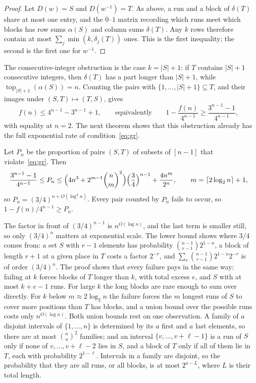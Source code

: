 \documentclass[12pt]{article}
\numberwithin{theorem}{section}
\numberwithin{equation}{section}
\begin{document}
\begin{proof}
Let $D(w)=S$ and $D(w^{-1})=T$. As above, a run and a block of $\delta(T)$ share at most one entry, and the
$0$--$1$ matrix recording which runs meet which blocks has row sums $\alpha(S)$ and column sums $\delta(T)$. Any
$k$ rows therefore contain at most $\sum_j\min(k,\delta_j(T))$ ones. This is the first inequality; the second is
the first one for $w^{-1}$.
\end{proof}

The consecutive-integer obstruction is the case $k=|S|+1$: if $T$ contains $|S|+1$ consecutive integers, then
$\delta(T)$ has a part longer than $|S|+1$, while $\operatorname{top}_{|S|+1}(\alpha(S))=n$. Counting the pairs
with $\{1,\dots,|S|+1\}\subseteq T$, and their images under $(S,T)\mapsto(T,S)$, gives
\[
f(n)\le 4^{n-1}-3^{n-1}+1,\qquad\text{equivalently}\qquad 1-\frac{f(n)}{4^{n-1}}\ge\frac{3^{n-1}-1}{4^{n-1}},
\]
with equality at $n=2$. The next theorem shows that this obstruction already has the full exponential rate of
condition~\eqref{eq:gr}.

\begin{theorem}\label{thm:grrate}
Let $P_n$ be the proportion of pairs $(S,T)$ of subsets of $[n-1]$ that violate~\eqref{eq:gr}. Then
\[
\frac{3^{n-1}-1}{4^{n-1}}\le P_n\le
\Bigl(4n^3+2^{m-1}\binom nm^2\Bigr)\Bigl(\frac34\Bigr)^{n-1}+\frac{4n^m}{2^{n}},
\qquad m=\lceil2\log_2n\rceil+1,
\]
so $P_n=(3/4)^{n+O(\log^2 n)}$. Every pair counted by $P_n$ fails to occur, so $1-f(n)/4^{n-1}\ge P_n$.
\end{theorem}

The factor in front of $(3/4)^{n-1}$ is $n^{O(\log n)}$, and the last term is smaller still, so only $(3/4)^n$
matters at exponential scale. The lower bound shows where $3/4$ comes from: a set $S$ with $r-1$ elements has
probability $\binom{n-1}{r-1}2^{1-n}$, a block of length $r+1$ at a given place in $T$ costs a factor $2^{-r}$,
and $\sum_r\binom{n-1}{r-1}2^{1-n}2^{-r}$ is of order $(3/4)^{n}$. The proof shows that every failure pays in the
same way: failing at $k$ forces blocks of $T$ longer than $k$, with total excess $e$, and $S$ with at most $k+e-1$
runs. For large $k$ the long blocks are rare enough to sum over directly. For $k$ below $m\approx2\log_2n$ the
failure forces the $m$ longest runs of $S$ to cover more positions than $T$ has blocks, and a union bound over the
possible runs costs only $n^{O(\log n)}$. Both union bounds rest on one observation. A family of $a$ disjoint
intervals of $\{1,\dots,n\}$ is determined by its $a$ first and $a$ last elements, so there are at most
$\binom na^2$ families; and an interval $\{v,\dots,v+\ell-1\}$ is a run of $S$ only if none of $v,\dots,v+\ell-2$
lies in $S$, and a block of $T$ only if all of them lie in $T$, each with probability $2^{1-\ell}$. Intervals
in a family are disjoint, so the probability that they are all runs, or all blocks, is at most $2^{a-L}$, where $L$
is their total length.
\end{document}
